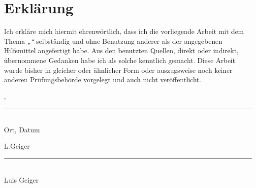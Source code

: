
\chapter*{Erklärung}

Ich erkläre mich hiermit ehrenwörtlich, dass ich die vorliegende Arbeit {\documentTypePhrase} mit dem Thema
 \textit{„\documentTitle“} selbständig und
ohne Benutzung anderer als der angegebenen Hilfsmittel angefertigt habe. Aus den
benutzten Quellen, direkt oder indirekt, übernommene Gedanken habe ich als solche
kenntlich gemacht.
Diese Arbeit wurde bisher in gleicher oder ähnlicher Form oder auszugsweise noch
keiner anderen Prüfungsbehörde vorgelegt und auch nicht veröffentlicht.


\vspace{3em}

\begin{minipage}[t]{0.45\textwidth}
\releaseOrt, \releaseDate
\vspace{-1em}

\rule{6cm}{0.4pt}\\
Ort, Datum
\end{minipage}
\hfill
\begin{minipage}[t]{0.45\textwidth}
L.Geiger
\vspace{-1em}

\rule{6cm}{0.4pt}\\
Luis Geiger
\end{minipage}

